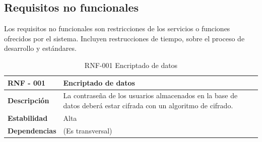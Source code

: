 \subsection{Requisitos no funcionales}


Los requisitos no funcionales son restricciones de los servicios o funciones ofrecidos por el sistema. Incluyen restrucciones de tiempo, sobre el proceso de desarrollo y estándares\cite{sommerville}.

\begin{table}[htpb]
\centering
\begin{tabularx}{\textwidth}{|l|X|}
\hline
\rowcolor[gray]{0.9}\textbf{RNF - 001}                               & \textbf{Encriptado de datos}                                                                                            \\ \hline
\textbf{Descripción}                             & La contraseña de los usuarios almacenados en la base de datos deberá estar cifrada con un algoritmo de cifrado. \\ \hline
\textbf{Estabilidad}                             & Alta                                                                                                           \\ \hline
\textbf{Dependencias} & (Es transversal)                                                                                               \\ \hline
\end{tabularx}
\caption{RNF-001 Encriptado de datos}                                                                                                                                                                                                                                                                      
\end{table}

\clearpage

